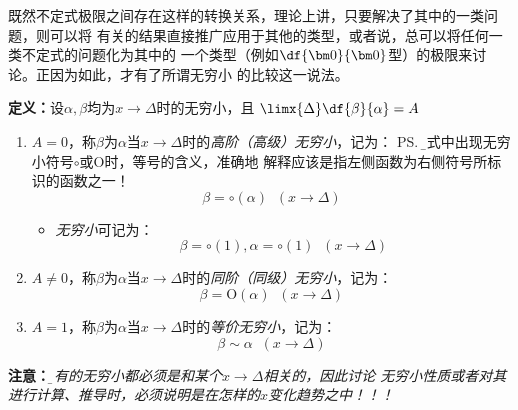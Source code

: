 既然不定式极限之间存在这样的转换关系，理论上讲，只要解决了其中的一类问题，则可以将
有关的结果直接推广应用于其他的类型，或者说，总可以将任何一类不定式的问题化为其中的
一个类型（例如$\df{\bm0}{\bm0}$型）的极限来讨论。正因为如此，才有了所谓无穷小
的比较这一说法。

{\bf 定义：}设$\alpha,\beta$均为$x\to\Delta$时的无穷小，且
$\limx{\Delta}\df{\beta}{\alpha}=A$
\begin{enumerate}[(1)]
  \setlength{\itemindent}{1cm}
  \item $A=0$，称$\beta$为$\alpha$当$x\to\Delta$时的{\it 高阶（高级）无穷小}，记为：
  \ps{\b 等式中出现无穷小符号$\circ$或$\mathrm{O}$时，等号的含义，准确地
  解释应该是指左侧函数为右侧符号所标识的函数之一！}
  $$\beta=\circ(\alpha)\;\;(x\to\Delta)$$
  \begin{itemize}
    \item {\it 无穷小}可记为：
    $$\beta=\circ(1),\alpha=\circ(1)\;\;(x\to\Delta)$$
  \end{itemize}
  \item $A\ne 0$，称$\beta$为$\alpha$当$x\to\Delta$时的{\it 同阶（同级）无穷小}，记为：
  $$\beta=\mathrm{O}(\alpha)\;\;(x\to\Delta)$$
  \item $A=1$，称$\beta$为$\alpha$当$x\to\Delta$时的{\it 等价无穷小}，记为：
  $$\beta\sim \alpha\;\;(x\to\Delta)$$
\end{enumerate}

{\bf 注意：}{\it\b 所有的无穷小都必须是和某个$x\to\Delta$相关的，因此讨论
无穷小性质或者对其进行计算、推导时，必须说明是在怎样的$x$变化趋势之中！！！}

